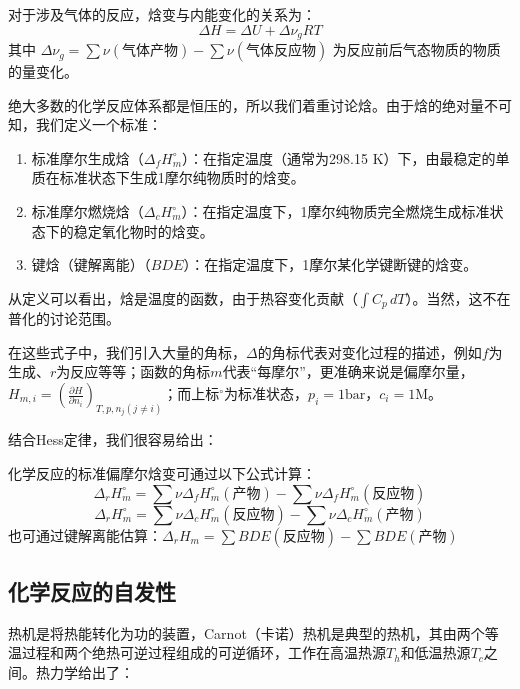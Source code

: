 \begin{proposition}[焓变与内能变化的关系]
对于涉及气体的反应，焓变与内能变化的关系为：
$$\Delta H = \Delta U + \Delta \nu_g RT$$
其中 $\Delta \nu_g = \sum \nu(\text{气体产物}) - \sum \nu(\text{气体反应物})$ 为反应前后气态物质的物质的量变化。
\end{proposition}

绝大多数的化学反应体系都是恒压的，所以我们着重讨论焓。由于焓的绝对量不可知，我们定义一个标准：

\begin{definition}
\begin{enumerate}
    \item 标准摩尔生成焓（$\Delta_f H_m^\circ$）：在指定温度（通常为298.15 K）下，由最稳定的单质在标准状态下生成1摩尔纯物质时的焓变。
    \item 标准摩尔燃烧焓（$\Delta_c H_m^\circ$）：在指定温度下，1摩尔纯物质完全燃烧生成标准状态下的稳定氧化物时的焓变。
    \item 键焓（键解离能）（$BDE$）：在指定温度下，1摩尔某化学键断键的焓变。
\end{enumerate}
\end{definition}

从定义可以看出，焓是温度的函数，由于热容变化贡献（$\int C_p \,dT$）。当然，这不在普化的讨论范围。

在这些式子中，我们引入大量的角标，$\Delta$的角标代表对变化过程的描述，例如$f$为生成、$r$为反应等等；函数的角标$m$代表“每摩尔”，更准确来说是偏摩尔量，$H_{m,i} = \left( \frac{\partial H}{\partial n_i} \right)_{T, p, n_j (j \neq i)}$；而上标$^\circ$为标准状态，$p_i = 1 \text{bar}$，$c_i = 1 \text{M} $。

结合Hess定律，我们很容易给出：

\begin{proposition}[化学反应的焓变]
化学反应的标准偏摩尔焓变可通过以下公式计算：
$$\Delta_r H_m^\circ = \sum \nu \Delta_f H_m^\circ(\text{产物}) - \sum \nu \Delta_f H_m^\circ(\text{反应物})$$
$$\Delta_r H_m^\circ = \sum \nu \Delta_c H_m^\circ(\text{反应物}) - \sum \nu \Delta_c H_m^\circ(\text{产物})$$
也可通过键解离能估算：$\Delta_r H_m = \sum BDE(\text{反应物}) - \sum BDE(\text{产物})$
\end{proposition}

\subsection{化学反应的自发性}

热机是将热能转化为功的装置，Carnot（卡诺）热机是典型的热机，其由两个等温过程和两个绝热可逆过程组成的可逆循环，工作在高温热源$T_h$和低温热源$T_c$之间。热力学给出了：

